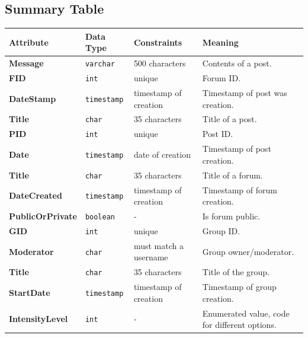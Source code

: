 \documentclass{article}
\begin{document}
\subsection{Summary Table}
\begin{adjustwidth}{-2.25cm}{}
    \begin{center}
    \begin{tabular}{l|lll}
        \toprule
        \textbf{Attribute}        & \textbf{Data Type} & \textbf{Constraints}  & \textbf{Meaning} \\ \hline
        \textbf{Message}          & \texttt{varchar}   & 500 characters        & Contents of a post.  \\
        \textbf{FID}              & \texttt{int}       & unique                & Forum ID.  \\
        \textbf{DateStamp}        & \texttt{timestamp} & timestamp of creation & Timestamp of post was creation.  \\
        \textbf{Title}            & \texttt{char}      & 35 characters         & Title of a post.  \\ \midrule
        \textbf{PID}              & \texttt{int}       & unique                & Post ID.  \\
        \textbf{Date}             & \texttt{timestamp} & date of creation      & Timestamp of post creation.  \\
        \textbf{Title}            & \texttt{char}      & 35 characters         & Title of a forum.  \\
        \textbf{DateCreated}      & \texttt{timestamp} & timestamp of creation & Timestamp of forum creation.  \\ \midrule
        \textbf{PublicOrPrivate}  & \texttt{boolean}   & -                     & Is forum public.  \\
        \textbf{GID}              & \texttt{int}       & unique                & Group ID.  \\
        \textbf{Moderator}        & \texttt{char}      & must match a username & Group owner/moderator.  \\
        \textbf{Title}            & \texttt{char}      & 35 characters         & Title of the group.  \\ \midrule
        \textbf{StartDate}        & \texttt{timestamp} & timestamp of creation & Timestamp of group creation.  \\
        \textbf{IntensityLevel}   & \texttt{int}       & -                     & Enumerated value, code for different options.  \\

\end{tabular}
\end{center}
\end{adjustwidth}
\end{document}
